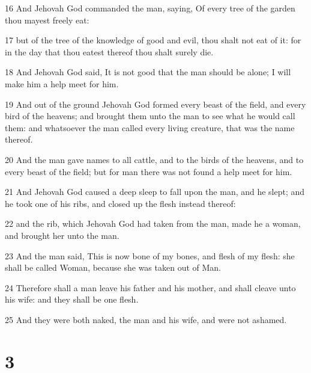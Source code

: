 \par 16 And Jehovah God commanded the man, saying, Of every tree of the garden thou mayest freely eat:
\par 17 but of the tree of the knowledge of good and evil, thou shalt not eat of it: for in the day that thou eatest thereof thou shalt surely die.
\par 18 And Jehovah God said, It is not good that the man should be alone; I will make him a help meet for him.
\par 19 And out of the ground Jehovah God formed every beast of the field, and every bird of the heavens; and brought them unto the man to see what he would call them: and whatsoever the man called every living creature, that was the name thereof.
\par 20 And the man gave names to all cattle, and to the birds of the heavens, and to every beast of the field; but for man there was not found a help meet for him.
\par 21 And Jehovah God caused a deep sleep to fall upon the man, and he slept; and he took one of his ribs, and closed up the flesh instead thereof:
\par 22 and the rib, which Jehovah God had taken from the man, made he a woman, and brought her unto the man.
\par 23 And the man said, This is now bone of my bones, and flesh of my flesh: she shall be called Woman, because she was taken out of Man.
\par 24 Therefore shall a man leave his father and his mother, and shall cleave unto his wife: and they shall be one flesh.
\par 25 And they were both naked, the man and his wife, and were not ashamed.

\chapter{3}

